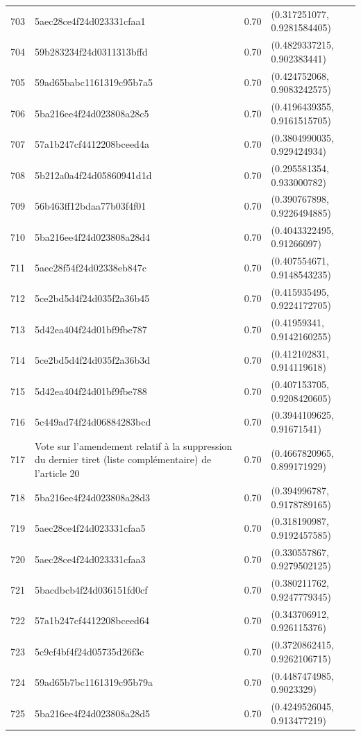 \begin{table}[ht]
\begin{tabular}{rlrl}
  703 & 5aec28ce4f24d023331cfaa1 & 0.70 & (0.317251077, 0.9281584405) \\ 
  704 & 59b283234f24d0311313bffd & 0.70 & (0.4829337215, 0.902383441) \\ 
  705 & 59ad65babc1161319c95b7a5 & 0.70 & (0.424752068, 0.9083242575) \\ 
  706 & 5ba216ee4f24d023808a28c5 & 0.70 & (0.4196439355, 0.9161515705) \\ 
  707 & 57a1b247cf4412208bceed4a & 0.70 & (0.3804990035, 0.929424934) \\ 
  708 & 5b212a0a4f24d05860941d1d & 0.70 & (0.295581354, 0.933000782) \\ 
  709 & 56b463ff12bdaa77b03f4f01 & 0.70 & (0.390767898, 0.9226494885) \\ 
  710 & 5ba216ee4f24d023808a28d4 & 0.70 & (0.4043322495, 0.91266097) \\ 
  711 & 5aec28f54f24d02338eb847c & 0.70 & (0.407554671, 0.9148543235) \\ 
  712 & 5ce2bd5d4f24d035f2a36b45 & 0.70 & (0.415935495, 0.9224172705) \\ 
  713 & 5d42ea404f24d01bf9fbe787 & 0.70 & (0.41959341, 0.9142160255) \\ 
  714 & 5ce2bd5d4f24d035f2a36b3d & 0.70 & (0.412102831, 0.914119618) \\ 
  715 & 5d42ea404f24d01bf9fbe788 & 0.70 & (0.407153705, 0.9208420605) \\ 
  716 & 5c449ad74f24d06884283bcd & 0.70 & (0.3944109625, 0.91671541) \\ 
  717 & Vote sur l'amendement relatif à la suppression du dernier tiret (liste complémentaire) de l'article 20 & 0.70 & (0.4667820965, 0.899171929) \\ 
  718 & 5ba216ee4f24d023808a28d3 & 0.70 & (0.394996787, 0.9178789165) \\ 
  719 & 5aec28ce4f24d023331cfaa5 & 0.70 & (0.318190987, 0.9192457585) \\ 
  720 & 5aec28ce4f24d023331cfaa3 & 0.70 & (0.330557867, 0.9279502125) \\ 
  721 & 5bacdbcb4f24d036151fd0cf & 0.70 & (0.380211762, 0.9247779345) \\ 
  722 & 57a1b247cf4412208bceed64 & 0.70 & (0.343706912, 0.926115376) \\ 
  723 & 5c9cf4bf4f24d05735d26f3c & 0.70 & (0.3720862415, 0.9262106715) \\ 
  724 & 59ad65b7bc1161319c95b79a & 0.70 & (0.4487474985, 0.9023329) \\ 
  725 & 5ba216ee4f24d023808a28d5 & 0.70 & (0.4249526045, 0.913477219) \\ 

\end{tabular}
\end{table}
